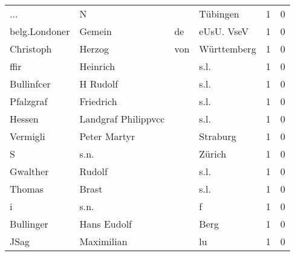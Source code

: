 \documentclass[10pt,a4paper,landscape]{article}
\begin{document}
\begin{longtable}{llllrr}
                      ... &                                  N &             &                                    Tübingen &          1 &         0 \\
            belg.Londoner &                             Gemein &          de &                                  eUsU. VseV &          1 &         0 \\
                Christoph &                             Herzog &         von &                                 Württemberg &          1 &         0 \\
                     ffir &                           Heinrich &             &                                        s.l. &          1 &         0 \\
               Bullinfcer &                           H Rudolf &             &                                        s.l. &          1 &         0 \\
                Pfalzgraf &                          Friedrich &             &                                        s.l. &          1 &         0 \\
                   Hessen &                Landgraf Philippvcc &             &                                        s.l. &          1 &         0 \\
                 Vermigli &                       Peter Martyr &             &                                    Straburg &          1 &         0 \\
                        S &                               s.n. &             &                                      Zürich &          1 &         0 \\
                 Gwalther &                             Rudolf &             &                                        s.l. &          1 &         0 \\
                   Thomas &                              Brast &             &                                        s.l. &          1 &         0 \\
                        i &                               s.n. &             &                                           f &          1 &         0 \\
                Bullinger &                        Hans Eudolf &             &                                        Berg &          1 &         0 \\
                     JSag &                         Maximilian &             &                                          lu &          1 &         0 \\

\end{longtable}
\end{document}
